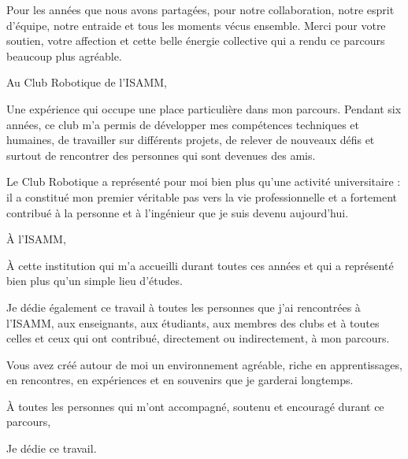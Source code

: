 \begin{flushleft}
Pour les années que nous avons partagées, pour notre collaboration, notre esprit d'équipe,
notre entraide et tous les moments vécus ensemble.
Merci pour votre soutien, votre affection et cette belle énergie collective
qui a rendu ce parcours beaucoup plus agréable.

\vspace{0.4cm}

Au Club Robotique de l'ISAMM,

Une expérience qui occupe une place particulière dans mon parcours.
Pendant six années, ce club m'a permis de développer mes compétences techniques
et humaines, de travailler sur différents projets, de relever de nouveaux défis
et surtout de rencontrer des personnes qui sont devenues des amis.

Le Club Robotique a représenté pour moi bien plus qu'une activité universitaire :
il a constitué mon premier véritable pas vers la vie professionnelle
et a fortement contribué à la personne et à l'ingénieur que je suis devenu aujourd'hui.

\vspace{0.4cm}

À l'ISAMM,

À cette institution qui m'a accueilli durant toutes ces années et qui a représenté
bien plus qu'un simple lieu d'études.

Je dédie également ce travail à toutes les personnes que j'ai rencontrées à l'ISAMM,
aux enseignants, aux étudiants, aux membres des clubs et à toutes celles et ceux
qui ont contribué, directement ou indirectement, à mon parcours.

Vous avez créé autour de moi un environnement agréable, riche en apprentissages,
en rencontres, en expériences et en souvenirs que je garderai longtemps.

\vspace{0.4cm}

À toutes les personnes qui m'ont accompagné, soutenu et encouragé durant ce parcours,

Je dédie ce travail.
\end{flushleft}

\clearpage
